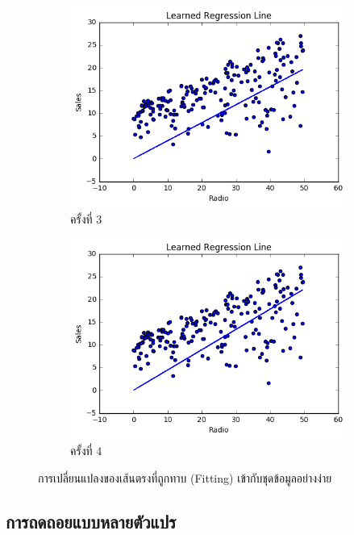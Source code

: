 \begin{figure}[htbp]
\begin{subfigure}{0.5\textwidth}
        \includegraphics[width=0.9\linewidth]{fig/plot_simple_reg_3.png}
        \caption{ครั้งที่ 3}
        \label{fig:plot_simple_reg_3}
    \end{subfigure}%
    \begin{subfigure}{0.5\textwidth}
        \centering
        \includegraphics[width=0.9\linewidth]{fig/plot_simple_reg_4.png}
        \caption{ครั้งที่ 4}
        \label{fig:plot_simple_reg_4}
    \end{subfigure}
    \caption{การเปลี่ยนแปลงของเส้นตรงที่ถูกทาบ (Fitting) เข้ากับชุดข้อมูลอย่างง่าย}
    \label{fig:simple_reg_change}
\end{figure}

\subsection{การถดถอยแบบหลายตัวแปร}
\label{ssec:multi_lin_res}

